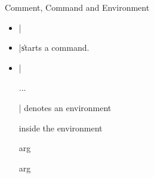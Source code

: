 \begin{frame}[fragile]{Comment, Command and Environment}
  \begin{itemize}
    \item \latexinline|%
    \item \latexinline|\| starts a command.
          \begin{latexcode}
            \command %
            \command{} %
          \end{latexcode}
    \item \latexinline|\begin{} ... \end{}| denotes an environment
          \begin{latexcode}
            \begin{envname}
              inside the environment
            \end{envname}
            \begin{envname}{arg} \end{envname}
            \begin{envname}{arg} \end{envname}
          \end{latexcode}
  \end{itemize}
\end{frame}

